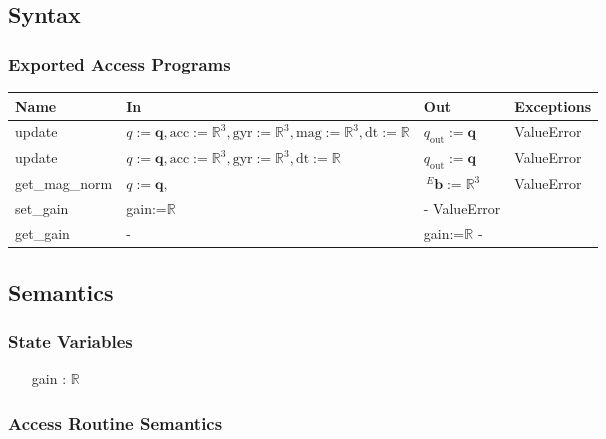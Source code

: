 \documentclass[12pt, titlepage]{article}
\begin{document}
\subsection{Syntax}

\subsubsection{Exported Access Programs}

\begin{center}
\begin{tabular}{p{2.5cm} p{6cm} p{2cm} p{1.5cm}}
\hline
\textbf{Name} & \textbf{In} & \textbf{Out} & \textbf{Exceptions} \\
\hline
update & $q:=\mathbf{q}, \text{acc}:=\mathbb{R}^3, \text{gyr}:=\mathbb{R}^3, \text{mag}:=\mathbb{R}^3, \text{dt}:=\mathbb{R}$ & $q_\text{out}:=\mathbf{q}$ & ValueError \\
update & $q:=\mathbf{q}, \text{acc}:=\mathbb{R}^3, \text{gyr}:=\mathbb{R}^3, \text{dt}:=\mathbb{R}$ & $q_\text{out}:=\mathbf{q}$ & ValueError \\
get\_mag\_norm & $q:=\mathbf{q}, $ & $\,^E\mathbf{b}:=\mathbb{R}^3$ & ValueError \\
set\_gain & gain:=$\mathbb{R}$ & - ValueError \\
get\_gain & - & gain:=$\mathbb{R}$ - \\
\hline
\end{tabular}
\end{center}

\subsection{Semantics}

\subsubsection{State Variables}
\begin{itemize}
  \item[gain] : $\mathbb{R}$
\end{itemize}

\subsubsection{Access Routine Semantics}
\end{document}
